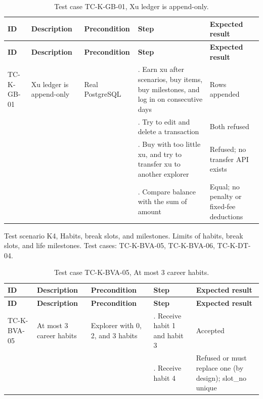 {\small
\begin{longtable}{|>{\raggedright\arraybackslash}p{}|>{\raggedright\arraybackslash}p{}|>{\raggedright\arraybackslash}p{}|>{\raggedright\arraybackslash}p{}|>{\raggedright\arraybackslash}p{}|}
\caption{Test case TC-K-GB-01, Xu ledger is append-only.} \\
\hline
\textbf{ID} & \textbf{Description} & \textbf{Precondition} & \textbf{Step} & \textbf{Expected result} \\ \hline
\endfirsthead
\hline
\textbf{ID} & \textbf{Description} & \textbf{Precondition} & \textbf{Step} & \textbf{Expected result} \\ \hline
\endhead
TC-K-GB-01 & Xu ledger is append-only & Real PostgreSQL & 1. Earn xu after scenarios, buy items, buy milestones, and log in on consecutive days & Rows appended \\ \hline
 &  &  & 2. Try to edit and delete a transaction & Both refused \\ \hline
 &  &  & 3. Buy with too little xu, and try to transfer xu to another explorer & Refused; no transfer API exists \\ \hline
 &  &  & 4. Compare balance with the sum of amount & Equal; no penalty or fixed-fee deductions \\ \hline
\end{longtable}
}

Test scenario K4, Habits, break slots, and milestones. Limits of habits, break slots, and life milestones. Test cases: TC-K-BVA-05, TC-K-BVA-06, TC-K-DT-04.

{\small
\begin{longtable}{|>{\raggedright\arraybackslash}p{}|>{\raggedright\arraybackslash}p{}|>{\raggedright\arraybackslash}p{}|>{\raggedright\arraybackslash}p{}|>{\raggedright\arraybackslash}p{}|}
\caption{Test case TC-K-BVA-05, At most 3 career habits.} \\
\hline
\textbf{ID} & \textbf{Description} & \textbf{Precondition} & \textbf{Step} & \textbf{Expected result} \\ \hline
\endfirsthead
\hline
\textbf{ID} & \textbf{Description} & \textbf{Precondition} & \textbf{Step} & \textbf{Expected result} \\ \hline
\endhead
TC-K-BVA-05 & At most 3 career habits & Explorer with 0, 2, and 3 habits & 1. Receive habit 1 and habit 3 & Accepted \\ \hline
 &  &  & 2. Receive habit 4 & Refused or must replace one (by design); slot\_no unique \\ \hline
\end{longtable}
}

